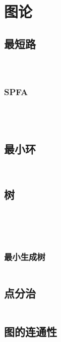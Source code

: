 \documentclass[a4paper,11pt]{article}
\begin{document}
{\newpage
\section{图论} %
\subsection{最短路} %
\inputminted[breaklines]{c++}{图论/最短路/Dijkstra+堆优化.cpp} %
\inputminted[breaklines]{c++}{图论/最短路/Floyd.cpp} %
\inputminted[breaklines]{c++}{图论/最短路/第k短路.cpp} %
\subsubsection{SPFA} %
\inputminted[breaklines]{c++}{图论/最短路/SPFA/DFS优化.cpp} %
\inputminted[breaklines]{c++}{图论/最短路/SPFA/LLL优化.cpp} %
\inputminted[breaklines]{c++}{图论/最短路/SPFA/SLF+容错.cpp} %
\inputminted[breaklines]{c++}{图论/最短路/SPFA/SPFA（可判环）.cpp} %
\subsection{最小环} %
\inputminted[breaklines]{c++}{图论/最小环/Dijkstra+剪枝.cpp} %
\inputminted[breaklines]{c++}{图论/最小环/Floyd.cpp} %
\subsection{树} %
\inputminted[breaklines]{c++}{图论/树/树的直径.cpp} %
\inputminted[breaklines]{c++}{图论/树/树上倍增.cpp} %
\inputminted[breaklines]{c++}{图论/树/LCA(倍增).cpp} %
\inputminted[breaklines]{c++}{图论/树/树上差分.cpp} %
\inputminted[breaklines]{c++}{图论/树/树链剖分.cpp} %
\subsubsection{最小生成树} %
\inputminted[breaklines]{c++}{图论/树/最小生成树/Boruvka.cpp} %
\subsection{点分治} %
\inputminted[breaklines]{c++}{图论/点分治/树上路径长度为k的点对数.cpp} %
\subsection{图的连通性} %
}
\end{document}
